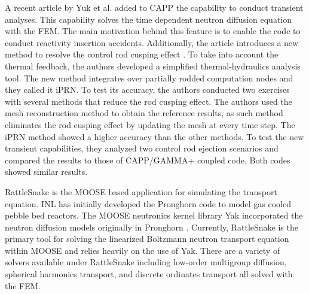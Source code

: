 \documentclass[11pt,letterpaper]{article}
\begin{document}
A recent article by Yuk et al. \cite{yuk_time-dependent_2020} added to CAPP the capability to conduct transient analyses.
This capability solves the time dependent neutron diffusion equation with the \gls{FEM}.
The main motivation behind this feature is to enable the code to conduct reactivity insertion accidents.
Additionally, the article introduces a new method to resolve the control rod cusping effect \cite{joo_resolution_1984}.
To take into account the thermal feedback, the authors developed a simplified thermal-hydraulics analysis tool.
The new method integrates over partially rodded computation nodes and they called it iPRN.
To test its accuracy, the authors conducted two exercises with several methods that reduce the rod cusping effect.
The authors used the mesh reconstruction method to obtain the reference results, as such method eliminates the rod cusping effect by updating the mesh at every time step.
The iPRN method showed a higher accuracy than the other methods.
To test the new transient capabilities, they analyzed two control rod ejection scenarios and compared the results to those of CAPP/GAMMA+ coupled code.
Both codes showed similar results.

RattleSnake \cite{wang_rattlesnake_2019} is the MOOSE \cite{gaston_moose_2009} based application for simulating the transport equation.
\gls{INL} has initially developed the Pronghorn code to model gas cooled pebble bed reactors.
The MOOSE neutronics kernel library Yak incorporated the neutron diffusion models originally in Pronghorn \cite{strydom_inl_2013}.
Currently, RattleSnake is the primary tool for solving the linearized Boltzmann neutron transport equation within MOOSE and relies heavily on the use of Yak.
There are a variety of solvers available under RattleSnake including low-order multigroup diffusion, spherical harmonics transport, and discrete ordinates transport all solved with the \gls{FEM}.
\end{document}
